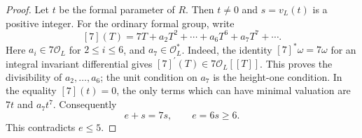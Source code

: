 \begin{proof}
Let $t$ be the formal parameter of $R$. Then $t\ne0$ and
$s=v_L(t)$ is a positive integer. For the ordinary formal group,
write
\[
 [7](T)=7T+a_2T^2+\cdots+a_6T^6+a_7T^7+\cdots.
\]
Here $a_i\in7\mathcal O_L$ for $2\leq i\leq6$, and
$a_7\in\mathcal O_L^*$.
Indeed, the identity $[7]^*\omega=7\omega$ for an integral
invariant differential gives $[7]^{\prime}(T)\in7\mathcal O_L[[T]]$.
This proves the divisibility of $a_2,\ldots,a_6$; the unit
condition on $a_7$ is the height-one condition.
In the equality $[7](t)=0$, the only terms which can have minimal
valuation are $7t$ and $a_7t^7$. Consequently
\[
 e+s=7s,\qquad e=6s\geq6.
\]
This contradicts $e\leq5$.
\end{proof}
